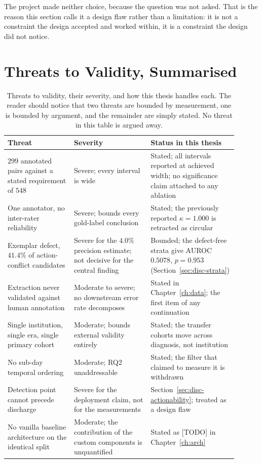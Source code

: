 The project made neither choice, because the question was not asked. That is the
reason this section calls it a design flaw rather than a limitation: it is not a
constraint the design accepted and worked within, it is a constraint the design
did not notice.

\section{Threats to Validity, Summarised}
\label{sec:disc-threats}

\begin{table}[t]
\centering
\small
\begin{tabular}{p{0.26\linewidth}p{0.30\linewidth}p{0.34\linewidth}}
\toprule
\textbf{Threat} & \textbf{Severity} & \textbf{Status in this thesis} \\
\midrule
$299$ annotated pairs against a stated requirement of $548$
& Severe; every interval is wide
& Stated; all intervals reported at achieved width; no significance claim
  attached to any ablation \\
\addlinespace
One annotator, no inter-rater reliability
& Severe; bounds every gold-label conclusion
& Stated; the previously reported $\kappa = 1.000$ is retracted as circular \\
\addlinespace
Exemplar defect, $41.4\%$ of action-conflict candidates
& Severe for the $4.0\%$ precision estimate; not decisive for the central
  finding
& Bounded; the defect-free strata give AUROC $0.5078$, $p = 0.953$
  (Section~\ref{sec:disc-strata}) \\
\addlinespace
Extraction never validated against human annotation
& Moderate to severe; no downstream error rate decomposes
& Stated in Chapter~\ref{ch:data}; the first item of any continuation \\
\addlinespace
Single institution, single era, single primary cohort
& Moderate; bounds external validity entirely
& Stated; the transfer cohorts move across diagnosis, not institution \\
\addlinespace
No sub-day temporal ordering
& Moderate; RQ2 unaddressable
& Stated; the filter that claimed to measure it is withdrawn \\
\addlinespace
Detection point cannot precede discharge
& Severe for the deployment claim, not for the measurements
& Section~\ref{sec:disc-actionability}; treated as a design flaw \\
\addlinespace
No vanilla baseline architecture on the identical split
& Moderate; the contribution of the custom components is unquantified
& Stated as [TODO] in Chapter~\ref{ch:arch} \\
\bottomrule
\end{tabular}
\caption{Threats to validity, their severity, and how this thesis handles each.
The reader should notice that two threats are bounded by measurement, one is
bounded by argument, and the remainder are simply stated. No threat in this
table is argued away.}
\label{tab:disc-threats}
\end{table}

